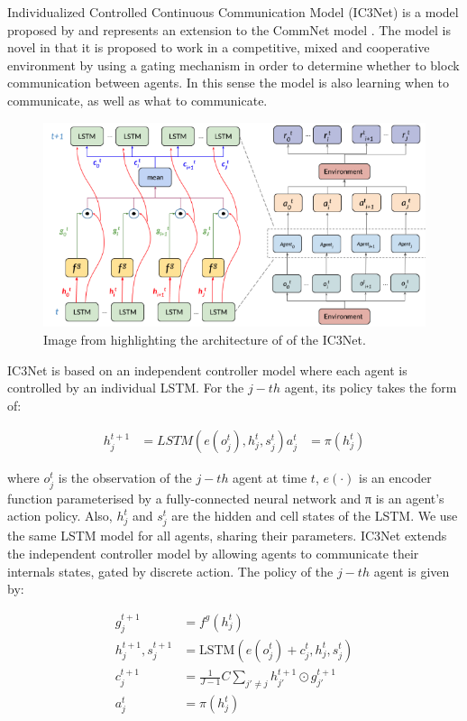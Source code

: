 \documentclass{article}
\begin{document}
Individualized Controlled Continuous Communication Model (IC3Net) is a model proposed by \citet{singh2018ic3net} and represents an extension to the CommNet model \citep{sukhbaatar2016commnet}. The model is novel in that it is proposed to work in a competitive, mixed and cooperative environment by using a gating mechanism in order to determine whether to block communication between agents. In this sense the model is also learning when to communicate, as well as what to communicate.

\begin{figure}
	\centering
	\includegraphics[scale=0.5]{images/ic3net.png}
	\caption{Image from \citet{singh2018ic3net} highlighting the architecture of of the IC3Net.}
	\label{fig:ic3net.png}
\end{figure}


IC3Net is based on an independent controller model where each agent is controlled by an individual LSTM. For the $j-th$ agent, its policy takes the form of:

\begin{align*}
h_j^{t + 1} &= LSTM(e(o_j^t), h_j^t, s_j^t)
a^t_j &= \pi(h^t_j)
\end{align*}

where $o_j^t$ is the observation of the $j-th$ agent at time $t$, $e(\cdot)$ is an encoder function parameterised by a fully-connected neural network and π is an agent’s action policy. Also, $h^t_j$ and $s^t_j$ are the hidden and cell states of the LSTM. We use the same LSTM model for all agents, sharing their parameters. IC3Net extends the independent controller model by allowing agents to communicate their internals states, gated by discrete action. The policy of the $j-th$ agent is given by:

\begin{align*}
    g_j^{t+1} &= f^g\left(h_j^t\right) \\
    h_j^{t+1}, s_j^{t+1} &= \text{LSTM}\left(e\left(o_j^t\right) + c_j^t, h_j^t, s_j^t\right) \\
    c_j^{t+1} &= \frac{1}{J-1} C \sum_{j' \neq j} h_{j'}^{t+1} \odot g_{j'}^{t+1} \\
    a_j^t &= \pi\left(h_j^t\right)
\end{align*}
\end{document}
